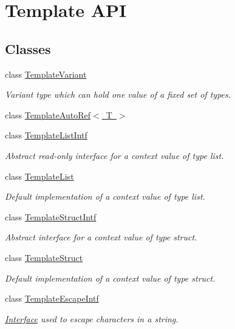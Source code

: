 \hypertarget{group__template__api}{}\section{Template A\+PI}
\label{group__template__api}
\subsection*{Classes}
\begin{DoxyCompactItemize}
\item 
class \mbox{\hyperlink{class_template_variant}{Template\+Variant}}
\begin{DoxyCompactList}\small\item\em Variant type which can hold one value of a fixed set of types. \end{DoxyCompactList}\item 
class \mbox{\hyperlink{class_template_auto_ref}{Template\+Auto\+Ref$<$ T $>$}}
\item 
class \mbox{\hyperlink{class_template_list_intf}{Template\+List\+Intf}}
\begin{DoxyCompactList}\small\item\em Abstract read-\/only interface for a context value of type list. \end{DoxyCompactList}\item 
class \mbox{\hyperlink{class_template_list}{Template\+List}}
\begin{DoxyCompactList}\small\item\em Default implementation of a context value of type list. \end{DoxyCompactList}\item 
class \mbox{\hyperlink{class_template_struct_intf}{Template\+Struct\+Intf}}
\begin{DoxyCompactList}\small\item\em Abstract interface for a context value of type struct. \end{DoxyCompactList}\item 
class \mbox{\hyperlink{class_template_struct}{Template\+Struct}}
\begin{DoxyCompactList}\small\item\em Default implementation of a context value of type struct. \end{DoxyCompactList}\item 
class \mbox{\hyperlink{class_template_escape_intf}{Template\+Escape\+Intf}}
\begin{DoxyCompactList}\small\item\em \mbox{\hyperlink{class_interface}{Interface}} used to escape characters in a string. \end{DoxyCompactList}\item 

\end{DoxyCompactItemize}
